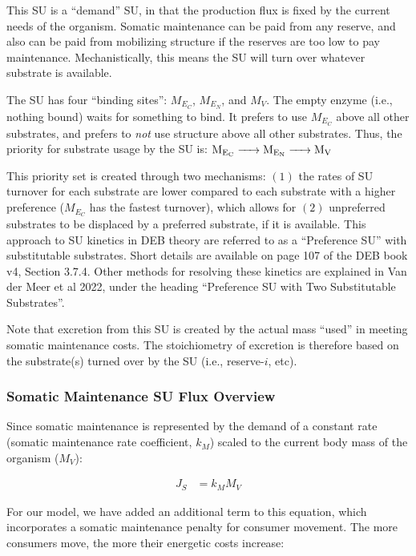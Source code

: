 \documentclass[
]{article}
\begin{document}
This SU is a ``demand'' SU, in that the production flux is fixed by the
current needs of the organism. Somatic maintenance can be paid from any
reserve, and also can be paid from mobilizing structure if the reserves
are too low to pay maintenance. Mechanistically, this means the SU will
turn over whatever substrate is available.

The SU has four ``binding sites'': \(M_{E_C}\), \(M_{E_N}\), and
\(M_{V}\). The empty enzyme (i.e., nothing bound) waits for something to
bind. It prefers to use \(M_{E_C}\) above all other substrates, and
prefers to \emph{not} use structure above all other substrates. Thus,
the priority for substrate usage by the SU is:
\(\ce{M_{E_C} -> M_{E_N} -> M_{V}}\)

This priority set is created through two mechanisms: \((1)\) the rates
of SU turnover for each substrate are lower compared to each substrate
with a higher preference (\(M_{E_C}\) has the fastest turnover), which
allows for \((2)\) unpreferred substrates to be displaced by a preferred
substrate, if it is available. This approach to SU kinetics in DEB
theory are referred to as a ``Preference SU'' with substitutable
substrates. Short details are available on page 107 of the DEB book v4,
Section 3.7.4. Other methods for resolving these kinetics are explained
in Van der Meer et al 2022, under the heading ``Preference SU with Two
Substitutable Substrates''.

Note that excretion from this SU is created by the actual mass ``used''
in meeting somatic maintenance costs. The stoichiometry of excretion is
therefore based on the substrate(s) turned over by the SU (i.e.,
reserve-\(i\), etc).

\subsubsection{Somatic Maintenance SU Flux
Overview}\label{somatic-maintenance-su-flux-overview}

Since somatic maintenance is represented by the demand of a constant
rate (somatic maintenance rate coefficient, \(k_M\)) scaled to the
current body mass of the organism (\(M_V\)):

\begin{align*}
J_S &= k_{\scriptscriptstyle M}M_V
\end{align*}

For our model, we have added an additional term to this equation, which
incorporates a somatic maintenance penalty for consumer movement. The
more consumers move, the more their energetic costs increase:
\end{document}
